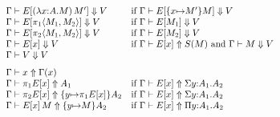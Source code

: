 \documentclass{article}
\theoremstyle{break}
\begin{document}
\newcommand{\weakconequiv}[5]{#1\vdash #2 : #3 \sim #4 : #5}
\newcommand{\conequiv}[4]{#1\vdash #2 \Join #3 : #4}
\newcommand{\aconequiv}[4]{#1\vdash #2 \iff #3 : #4}
\newcommand{\akindequiv}[3]{#1\vdash #2 \iff #3}
\newcommand{\headnormsto}[4]{#1\vdash #2 \Downarrow #4}
\newcommand{\reconstruct}[3]{#1\vdash #2 \Uparrow #3}
\newcommand{\isvalue}[3]{#1\vdash #2\mbox{\ value } #3}
\newcommand{\cvalue}{V}
\newcommand{\normterm}[3]{{#1}\vdash{#2}\mbox{\ norm\ }{#3}}
\newcommand{\normtype}[2]{{#1}\vdash{#2}\mbox{\ norm}}
\newcommand{\normE}[3]{{#1}\vdash{#2}\mbox{\ norm}^*\ {#3}}
\[
\!\!\!\!\!\!\!\begin{array}{lp{4.2truein}}
\headnormsto{\context}
   {E[\capply{(\cfunction{\cvar}{\kind}{\constructor})}
             {\constructor'}]}
   {\ktype}
   {\cvalue}&
   if 
   $\headnormsto{\context}
     {E[\substitute{\cvar}{\constructor'}{\constructor}]}{\ktype}{\cvalue}$\\

\headnormsto{\context}
   {E[\cpi{1}{\cpair{\constructor_1}{\constructor_2}}]}
   {\ktype}
   {\cvalue}&
   if
   $\headnormsto{\context}{E[\constructor_1]}{\ktype}{\cvalue}$\\
\headnormsto{\context}
   {E[\cpi{2}{\cpair{\constructor_1}{\constructor_2}}]}
   {\ktype}
   {\cvalue}&
   if
   $\headnormsto{\context}{E[\constructor_2]}{\ktype}{\cvalue}$\\
\headnormsto{\context}{E[\cvar]}{\ktype}{\cvalue}&
   if
   $\reconstruct{\context}{E[\cvar]}{\ksingleton{\constructor}}$ and
   $\headnormsto{\context}{\constructor}{\ktype}{\cvalue}$\\
\headnormsto{\context}{\cvalue}{\ktype}{\cvalue}\\[7pt]

\reconstruct{\context}{\cvar}{\context(\cvar)}\\
\reconstruct{\context}{\cpi{1}{E[\cvar]}}{\kind_1}&
  if
  $\reconstruct{\context}{E[\cvar]}{\ksigma{\othercvar}{\kind_1}{\kind_2}}$\\
\reconstruct{\context}{\cpi{2}{E[\cvar]}}
  {\substitute{\othercvar}{\cpi{1}{E[\cvar]}}\kind_2}&
  if
  $\reconstruct{\context}{E[\cvar]}{\ksigma{\othercvar}{\kind_1}{\kind_2}}$\\
\reconstruct{\context}{\capply{E[\cvar]}{\constructor}}
  {\substitute{\othercvar}{\constructor}{\kind_2}}&
  if
  $\reconstruct{\context}{E[\cvar]}{\kpi{\othercvar}{\kind_1}{\kind_2}}$\\[7pt]


\end{array}\]
\end{document}
